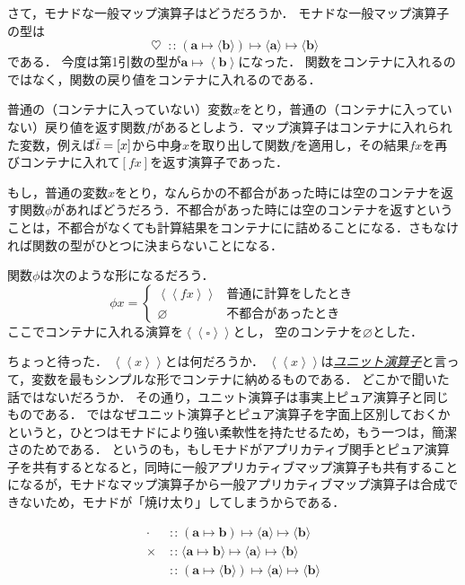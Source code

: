 \documentclass[a5paper,draft]{jsbook}
\newcommand{\keyword}[1]{{\underline{\emph{#1}}}}
\newcommand{\mathTypeParameter}[1]{\mathbf{#1}}
\newcommand{\mathPureWith}[1]{\left\langle#1\right\rangle}
\newcommand{\mathUnitWith}[1]{\left\langle\!\left\langle#1\right\rangle\!\right\rangle}
\newcommand{\mathListVar}[1]{\Bar{#1}}
\newcommand{\mathPureNothing}{\varnothing}
\newcommand{\mathSomething}{\square}
\newcommand{\mathBinaryOperator}[1]{\operatorname{#1}}
\newcommand{\mathApplicativeGeneralMap}{\times}
\newcommand{\mathGeneralMap}{\mathBinaryOperator{\cdot}}
\newcommand{\mathIn}{\mathBinaryOperator{:\!:}}
\newcommand{\mathMonadGeneralMap}{\mathBinaryOperator{\heartsuit}}
\newcommand{\mathMapsTo}{\mapsto}
\newcommand{\mathMorph}[2]{#1\mathMapsTo#2}
\newcommand{\mathMorphII}[3]{#1\mathMapsTo#2\mathMapsTo#3}
\DeclareMathOperator{\hsklMonadMap}{{DO NOT USE}--\heartsuit}
\begin{document}
さて，モナドな一般マップ演算子はどうだろうか．
モナドな一般マップ演算子の型は
\begin{equation}
\mathMonadGeneralMap
\mathIn{}\mathMorphII{(\mathMorph{\mathTypeParameter{a}}{\langle\mathTypeParameter{b}\rangle})}{\langle\mathTypeParameter{a}\rangle}{\langle{\mathTypeParameter{b}}\rangle}
\end{equation}
である．
今度は第1引数の型が$\mathTypeParameter{a}\mapsto\mathPureWith{\mathTypeParameter{b}}$になった．
関数をコンテナに入れるのではなく，関数の戻り値をコンテナに入れるのである．

普通の（コンテナに入っていない）変数$x$をとり，普通の（コンテナに入っていない）戻り値を返す関数$f$があるとしよう．マップ演算子はコンテナに入れられた変数，例えば$\mathListVar{t}=[x]$から中身$x$を取り出して関数$f$を適用し，その結果$fx$を再びコンテナに入れて$[fx]$を返す演算子であった．

もし，普通の変数$x$をとり，なんらかの不都合があった時には空のコンテナを返す関数$\phi$があればどうだろう．不都合があった時には空のコンテナを返すということは，不都合がなくても計算結果をコンテナにに詰めることになる．さもなければ関数の型がひとつに決まらないことになる．

関数$\phi$は次のような形になるだろう．
$$\phi x=\begin{cases}\mathUnitWith{fx}&\text{普通に計算をしたとき}\\
\mathPureNothing&\text{不都合があったとき}\end{cases}$$
ここでコンテナに入れる演算を$\mathUnitWith{\mathSomething}$とし，
空のコンテナを$\mathPureNothing$とした．

ちょっと待った．
$\mathUnitWith{x}$とは何だろうか．
$\mathUnitWith{x}$は\keyword{ユニット演算子}と言って，変数を最もシンプルな形でコンテナに納めるものである．
どこかで聞いた話ではないだろうか．
その通り，ユニット演算子は事実上ピュア演算子と同じものである．
ではなぜユニット演算子とピュア演算子を字面上区別しておくかというと，ひとつはモナドにより強い柔軟性を持たせるため，もう一つは，簡潔さのためである．
というのも，もしモナドがアプリカティブ関手とピュア演算子を共有するとなると，同時に一般アプリカティブマップ演算子も共有することになるが，モナドなマップ演算子から一般アプリカティブマップ演算子は合成できないため，モナドが「焼け太り」してしまうからである．

\begin{align*}
\mathGeneralMap&\mathIn{}\mathMorphII{(\mathMorph{\mathTypeParameter{a}}{\mathTypeParameter{b}})}{\langle\mathTypeParameter{a}\rangle}{\langle\mathTypeParameter{b}
\rangle}\\
\mathApplicativeGeneralMap&\mathIn{}\mathMorphII{\langle\mathMorph{\mathTypeParameter{a}}{\mathTypeParameter{b}}\rangle}{\langle\mathTypeParameter{a}\rangle}{\langle\mathTypeParameter{b}\rangle}\\
\hsklMonadMap&\mathIn{}\mathMorphII{(\mathMorph{\mathTypeParameter{a}}{\langle\mathTypeParameter{b}\rangle})}{\langle\mathTypeParameter{a}\rangle}{\langle{\mathTypeParameter{b}}\rangle}
\end{align*}
\end{document}
